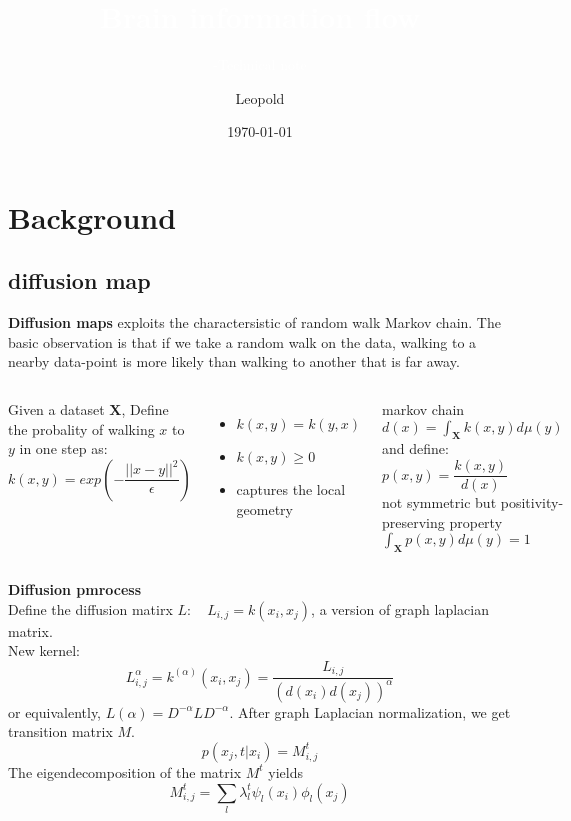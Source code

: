 \documentclass{beamer}	%
\title{\textcolor{white}{Brain information flow}}
\subtitle{\textcolor{white}{-Technical note}}
\author{Leopold}
\date{\today}
\theoremstyle{plain}
\theoremstyle{definition}
\theoremstyle{remark}
\numberwithin{equation}{section}
\begin{document}
\begin{frame}
\titlepage
\end{frame}



\section{Background}
\subsection{diffusion map}


\begin{frame}
	\textbf{Diffusion maps} exploits the charactersistic of random walk Markov chain. The basic observation is that if we take a random walk on the data, walking to a nearby data-point is more likely than walking to another that is far away.
	
	\hspace{0.5cm}
\begin{columns}
	Given a dataset $ \mathbf{X} $, Define the probality of walking $ x $ to $ y $ in one step as:\\
	$ k(x, y) = exp(-\dfrac{||x-y||^2}{\epsilon}) $
	\begin{itemize}
		\item $ k(x, y)=k(y, x) $
		\item $ k(x, y) \geq 0 $
		\item captures the local geometry
		
	\end{itemize}
	
	markov chain
	$d(x)=\int_{\mathbf{X}}k(x, y)d\mu(y)$\\
	and define:
	$p(x, y)=\dfrac{k(x, y)}{d(x)}$\\
	not symmetric but positivity-preserving property\\
	$\int_{\mathbf{X}}p(x, y)d\mu(y)=1$
	
	
\end{columns}
\end{frame}


\begin{frame}
\textbf{Diffusion pmrocess}\\
Define the diffusion matirx $L: \quad L_{i, j}=k(x_i, x_j)$, a version of graph laplacian matrix. \\
New kernel:
\[ L_{i, j}^{\alpha}=k^(\alpha)(x_i, x_j)=\dfrac{L_{i, j}}{\left(d(x_i)d(x_j)\right)^{\alpha}} \]
or equivalently, $L(\alpha) = D^{-\alpha}LD^{-\alpha}$. After graph Laplacian normalization, we get transition matrix $M$.
\[ p(x_j , t| x_i) = M_{i, j}^t \]
The eigendecomposition of the matrix $ M ^t$ yields
\[ M_{i, j}^t = \sum_{l} \lambda_{l}^t \psi_{l}(x_i)\phi_{l}(x_j) \]
\end{frame}
\end{document}
